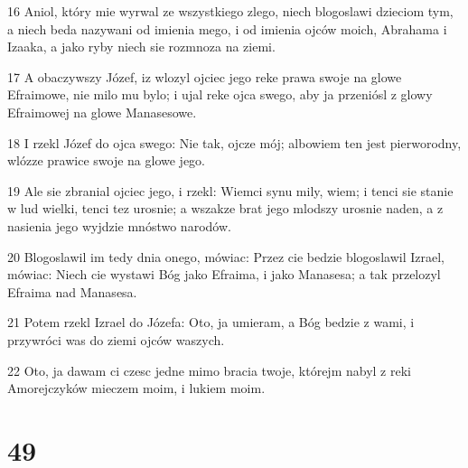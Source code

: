 \par 16 Aniol, który mie wyrwal ze wszystkiego zlego, niech blogoslawi dzieciom tym, a niech beda nazywani od imienia mego, i od imienia ojców moich, Abrahama i Izaaka, a jako ryby niech sie rozmnoza na ziemi.
\par 17 A obaczywszy Józef, iz wlozyl ojciec jego reke prawa swoje na glowe Efraimowe, nie milo mu bylo; i ujal reke ojca swego, aby ja przeniósl z glowy Efraimowej na glowe Manasesowe.
\par 18 I rzekl Józef do ojca swego: Nie tak, ojcze mój; albowiem ten jest pierworodny, wlózze prawice swoje na glowe jego.
\par 19 Ale sie zbranial ojciec jego, i rzekl: Wiemci synu mily, wiem; i tenci sie stanie w lud wielki, tenci tez urosnie; a wszakze brat jego mlodszy urosnie naden, a z nasienia jego wyjdzie mnóstwo narodów.
\par 20 Blogoslawil im tedy dnia onego, mówiac: Przez cie bedzie blogoslawil Izrael, mówiac: Niech cie wystawi Bóg jako Efraima, i jako Manasesa; a tak przelozyl Efraima nad Manasesa.
\par 21 Potem rzekl Izrael do Józefa: Oto, ja umieram, a Bóg bedzie z wami, i przywróci was do ziemi ojców waszych.
\par 22 Oto, ja dawam ci czesc jedne mimo bracia twoje, którejm nabyl z reki Amorejczyków mieczem moim, i lukiem moim.

\chapter{49}

